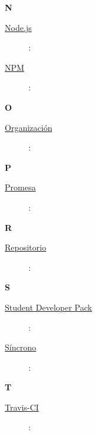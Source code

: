 \bigskip
{\bfseries {\Huge N}}\label{Apendice1:N}
\bigskip
\bigskip

\begin{description}
  \item[\underline{Node.js}\label{apend1:node}]:
  \bigskip
\end{description}

\begin{description}
  \item[\underline{NPM}\label{apend1:npm}]:
  \bigskip
\end{description}

\bigskip
{\bfseries {\Huge O}}\label{Apendice1:O}
\bigskip
\bigskip

\begin{description}
  \item[\underline{Organización}\label{apend1:organizacion}]:
  \bigskip
\end{description}

\bigskip
{\bfseries {\Huge P}}\label{Apendice1:P}
\bigskip
\bigskip

\begin{description}
  \item[\underline{Promesa}\label{apend1:promesa}]:
  \bigskip
\end{description}

\bigskip
{\bfseries {\Huge R}}\label{Apendice1:R}
\bigskip
\bigskip

\begin{description}
  \item[\underline{Repositorio}\label{apend1:repositorio}]:
  \bigskip
\end{description}

{\bfseries {\Huge S}}\label{Apendice1:S}
\bigskip
\bigskip

\begin{description}
  \item[\underline{Student Developer Pack}\label{apend1:sdp}]: 
  \bigskip
\end{description}

\begin{description}
  \item[\underline{Síncrono}\label{apend1:sincrono}]: 
  \bigskip
\end{description}

{\bfseries {\Huge T}}\label{Apendice1:T}
\bigskip
\bigskip

\begin{description}
  \item[\underline{Travis-CI}\label{apend1:travis}]:
  \bigskip
\end{description}

